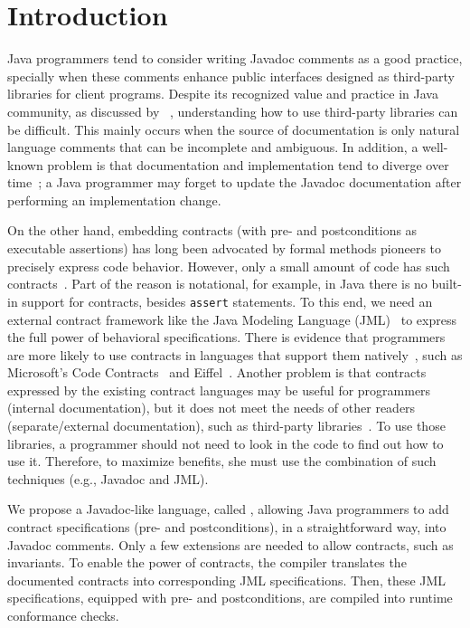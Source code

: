 \section{Introduction}
\label{sec:introduction}

Java programmers tend to consider writing Javadoc comments as a good practice,
specially when these comments enhance public interfaces designed as third-party
libraries for client programs.
%
Despite its recognized value and practice in Java community, 
as discussed by ~\cite{liveAPI},
understanding how to use third-party libraries can be difficult.
This mainly occurs when the source of documentation is only natural language 
comments that can be incomplete and ambiguous. In addition, a well-known problem is that
documentation and implementation tend to diverge over time~\cite{Estler-etal14}; 
a Java programmer may forget to update the Javadoc documentation after performing 
an implementation change.

%
On the other hand, embedding contracts (with pre- and postconditions as executable assertions) has
long been advocated by formal methods pioneers to precisely express code behavior. 
However, only a small amount of code has such contracts~\cite{Polikarpova-etal09}. 
Part of the reason is notational, for example, in Java there is
no built-in support for contracts, besides \texttt{assert} statements.
To this end, we need an external contract framework like the Java Modeling Language (JML)~\cite{jml}
to express the full power of behavioral specifications.
%
There is evidence that programmers are more likely to use contracts in languages that support them
natively~\cite{Chalin06}, such as Microsoft's Code Contracts~\cite{codeContractsPaper} and Eiffel~\cite{eiffel}.
%
Another problem is that contracts expressed by
the existing contract languages may be useful for programmers (internal documentation), 
but it does not meet the needs of other
readers (separate/external documentation), such as third-party libraries~\cite{Leavens10,Parnas2011}. 
To use those libraries, a programmer should not need to look in the code to 
find out how to use it. 
%
Therefore, to maximize benefits, 
she must use the combination of such techniques (e.g., Javadoc and JML).

%
We propose a Javadoc-like language, called \contractjdoc{}, allowing Java programmers to add
contract specifications (pre- and postconditions), in a straightforward way, into Javadoc comments.
%
Only a few extensions are needed to allow contracts,
such as invariants.
%
To enable the power of contracts, the \contractjdoc{} compiler
translates the documented contracts into corresponding JML specifications. 
Then, these JML specifications, equipped with pre- and postconditions, are  
compiled into runtime conformance checks.
%

